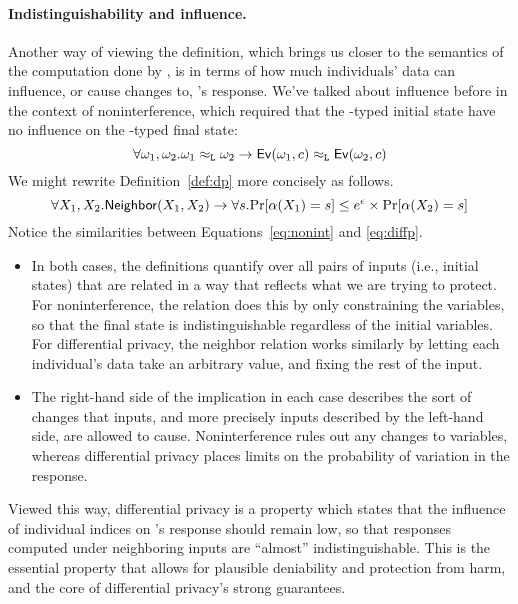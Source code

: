 \documentclass[11pt,twoside]{scrartcl}
\begin{document}
\paragraph{Indistinguishability and influence.} Another way of viewing the definition, which brings us closer to the semantics of the computation done by \san, is in terms of how much individuals' data can influence, or cause changes to, \san's response. We've talked about influence before in the context of noninterference, which required that the \hight-typed initial state have no influence on the \lowt-typed final state:
\begin{equation}
\label{eq:nonint}
\forall \omega_1, \omega_2 . \omega_1 \approx_\lowt \omega_2 \limply\ev(\omega_1, c) \approx_\lowt \ev(\omega_2, c)
\end{equation}
We might rewrite Definition~\ref{def:dp} more concisely as follows.
\begin{equation}
\label{eq:diffp}
\forall X_1, X_2 . \mathsf{Neighbor}(X_1, X_2) \limply\forall s . \mathrm{Pr}[\san(X_1) = s] \le e^\epsilon \times \mathrm{Pr}[\san(X_2) = s]
\end{equation}
Notice the similarities between Equations~\ref{eq:nonint} and \ref{eq:diffp}.
\begin{itemize}
\item In both cases, the definitions quantify over all pairs of inputs (i.e., initial states) that are related in a way that reflects what we are trying to protect. For noninterference, the relation does this by only constraining the \lowt variables, so that the final state is indistinguishable regardless of the initial \hight variables. For differential privacy, the neighbor relation works similarly by letting each individual's data take an arbitrary value, and fixing the rest of the input.

\item The right-hand side of the implication in each case describes the sort of changes that inputs, and more precisely inputs described by the left-hand side, are allowed to cause. Noninterference rules out any changes to \lowt variables, whereas differential privacy places limits on the probability of variation in the response.
\end{itemize}
Viewed this way, differential privacy is a property which states that the influence of individual indices on \san's response should remain low, so that responses computed under neighboring inputs are ``almost'' indistinguishable. This is the essential property that allows for plausible deniability and protection from harm, and the core of differential privacy's strong guarantees.
\end{document}
